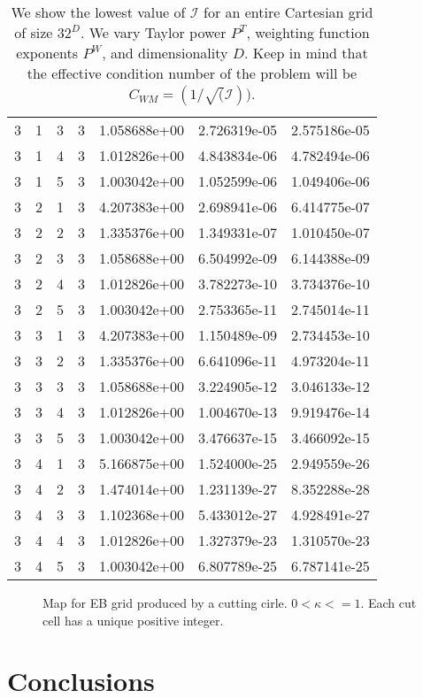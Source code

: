 \documentclass{article}
\newcommand{\cali}{\mathcal{I}}
\begin{document}
\begin{small}
\begin{table}
\begin{center}
\begin{tabular}{|cccc|ccc|}
3 & 1 & 3 & 3 & 1.058688e+00 & 2.726319e-05 & 2.575186e-05 \\ 
3 & 1 & 4 & 3 & 1.012826e+00 & 4.843834e-06 & 4.782494e-06 \\ 
3 & 1 & 5 & 3 & 1.003042e+00 & 1.052599e-06 & 1.049406e-06 \\ 
\hline
3 & 2 & 1 & 3 & 4.207383e+00 & 2.698941e-06 & 6.414775e-07 \\ 
3 & 2 & 2 & 3 & 1.335376e+00 & 1.349331e-07 & 1.010450e-07 \\ 
3 & 2 & 3 & 3 & 1.058688e+00 & 6.504992e-09 & 6.144388e-09 \\ 
3 & 2 & 4 & 3 & 1.012826e+00 & 3.782273e-10 & 3.734376e-10 \\ 
3 & 2 & 5 & 3 & 1.003042e+00 & 2.753365e-11 & 2.745014e-11 \\ 
\hline
3 & 3 & 1 & 3 & 4.207383e+00 & 1.150489e-09 & 2.734453e-10 \\ 
3 & 3 & 2 & 3 & 1.335376e+00 & 6.641096e-11 & 4.973204e-11 \\ 
3 & 3 & 3 & 3 & 1.058688e+00 & 3.224905e-12 & 3.046133e-12 \\ 
3 & 3 & 4 & 3 & 1.012826e+00 & 1.004670e-13 & 9.919476e-14 \\ 
3 & 3 & 5 & 3 & 1.003042e+00 & 3.476637e-15 & 3.466092e-15 \\ 
\hline
3 & 4 & 1 & 3 & 5.166875e+00 & 1.524000e-25 & 2.949559e-26 \\ 
3 & 4 & 2 & 3 & 1.474014e+00 & 1.231139e-27 & 8.352288e-28 \\ 
3 & 4 & 3 & 3 & 1.102368e+00 & 5.433012e-27 & 4.928491e-27 \\ 
3 & 4 & 4 & 3 & 1.012826e+00 & 1.327379e-23 & 1.310570e-23 \\ 
3 & 4 & 5 & 3 & 1.003042e+00 & 6.807789e-25 & 6.787141e-25 \\
\hline
\end{tabular}
\end{center}
\label{tab::worst_all_reg_inv_conv}
\caption
    {
      We show the lowest value of
      $\cali$ for an entire Cartesian grid of size $32^D$.
      We vary Taylor power $P^T$, weighting
      function exponents $P^W$, and dimensionality $D$.   Keep in mind
      that the effective condition number of the problem will be 
      $C_{WM} = (1/\sqrt(\cali))$.
    }
\end{table}
\end{small}

\begin{figure}
\centerline{} 
\caption
    {
      Map for EB grid produced by a cutting cirle. $0 <  \kappa <= 1$.
  Each cut cell has a unique positive integer.}
\label{fig::unmerged2dmap}
\end{figure}



\section{Conclusions}


\renewcommand{\thefootnote}{\fnsymbol{footnote}}\

\end{document}
